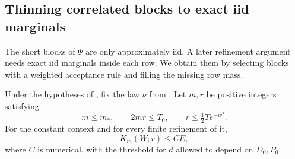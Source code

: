 \subsection{Thinning correlated blocks to exact iid marginals}

The short blocks of $\Psi$ are only approximately iid.  A later refinement
argument needs exact iid marginals inside each row.  We obtain them by
selecting blocks with a weighted acceptance rule and filling the missing
row mass.

\begin{lemma}
\label{entropy-foundations:thinning}
Under the hypotheses of , fix the law $\nu$
from .  Let $m,r$ be positive
integers satisfying
\[
 m\le m_*,\qquad 2mr\le T_0,\qquad
 r\le \tfrac12 T e^{-w^2}.
\]
For the constant context and for every finite refinement of it,
\begin{equation}
\label{eq:source-3}
 K_m(W;r)\le CE,
\end{equation}
where $C$ is numerical, with the threshold for $d$ allowed to depend on
$D_0,P_0$.
\end{lemma}

